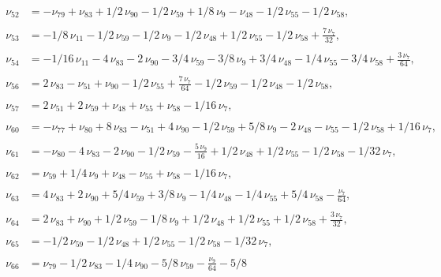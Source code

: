 \documentclass[a4paper,12pt, DIV=14, BCOR=5mm, twoside, headsepline, numbers=noenddot]{scrbook}
\begin{document}
\begin{align}\label{AreaSol6}
\begin{aligned}
\nu_{{52}}&=-\nu_{{79}}+\nu_{{83}}+1/2\,\nu_{{90}}-1/2\,\nu_{{59
}}+1/8\,\nu_{{9}}-\nu_{{48}}-1/2\,\nu_{{55}}-1/2\,\nu_{{58}}, \\
\\
\nu_{{53}
}&=-1/8\,\nu_{{11}}-1/2\,\nu_{{59}}-1/2\,\nu_{{9}}-1/2\,\nu_{{48}}+1/2
\,\nu_{{55}}-1/2\,\nu_{{58}}+{\frac {7\,\nu_{{7}}}{32}}, \\
\\
\nu_{{54}}&=-1/
16\,\nu_{{11}}-4\,\nu_{{83}}-2\,\nu_{{90}}-3/4\,\nu_{{59}}-3/8\,\nu_{{
9}}+3/4\,\nu_{{48}}-1/4\,\nu_{{55}}-3/4\,\nu_{{58}}+{\frac {3\,\nu_{{7
}}}{64}}, \\
\\
\nu_{{56}}&=2\,\nu_{{83}}-\nu_{{51}}+\nu_{{90}}-1/2\,\nu_{{55}
}+{\frac {7\,\nu_{{7}}}{64}}-1/2\,\nu_{{59}}-1/2\,\nu_{{48}}-1/2\,\nu_
{{58}}, \\
\\
\nu_{{57}}&=2\,\nu_{{51}}+2\,\nu_{{59}}+\nu_{{48}}+\nu_{{55}}+
\nu_{{58}}-1/16\,\nu_{{7}}, \\
\\
\nu_{{60}}&=-\nu_{{77}}+\nu_{{80}}+8\,\nu_{{
83}}-\nu_{{51}}+4\,\nu_{{90}}-1/2\,\nu_{{59}}+5/8\,\nu_{{9}}-2\,\nu_{{
48}}-\nu_{{55}}-1/2\,\nu_{{58}}+1/16\,\nu_{{7}}, \\
\\
\nu_{{61}}&=-\nu_{{80}}
-4\,\nu_{{83}}-2\,\nu_{{90}}-1/2\,\nu_{{59}}-{\frac {5\,\nu_{{9}}}{16}
}+1/2\,\nu_{{48}}+1/2\,\nu_{{55}}-1/2\,\nu_{{58}}-1/32\,\nu_{{7}}, \\
\\
\nu_
{{62}}&=\nu_{{59}}+1/4\,\nu_{{9}}+\nu_{{48}}-\nu_{{55}}+\nu_{{58}}-1/16
\,\nu_{{7}}, \\
\\
\nu_{{63}}&=4\,\nu_{{83}}+2\,\nu_{{90}}+5/4\,\nu_{{59}}+3/8
\,\nu_{{9}}-1/4\,\nu_{{48}}-1/4\,\nu_{{55}}+5/4\,\nu_{{58}}-{\frac {
\nu_{{7}}}{64}}, \\
\\
\nu_{{64}}&=2\,\nu_{{83}}+\nu_{{90}}+1/2\,\nu_{{59}}-1/
8\,\nu_{{9}}+1/2\,\nu_{{48}}+1/2\,\nu_{{55}}+1/2\,\nu_{{58}}+{\frac {3
\,\nu_{{7}}}{32}}, \\
\\
\nu_{{65}}&=-1/2\,\nu_{{59}}-1/2\,\nu_{{48}}+1/2\,\nu
_{{55}}-1/2\,\nu_{{58}}-1/32\,\nu_{{7}}, \\
\\
\nu_{{66}}&=\nu_{{79}}-1/2\,\nu
_{{83}}-1/4\,\nu_{{90}}-5/8\,\nu_{{59}}-{\frac {\nu_{{9}}}{64}}-5/8\,

\end{aligned}
\end{align}
\end{document}
